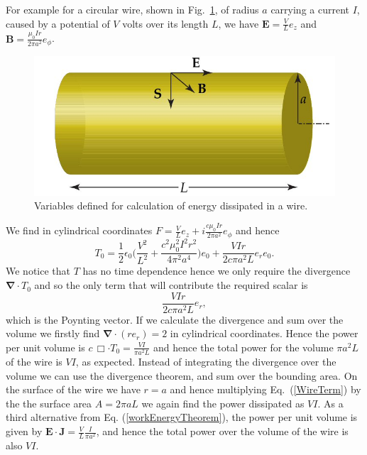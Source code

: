 \documentclass[12pt,aps,prb,preprint]{revtex4}   %
\newcommand{\be}{\begin{equation}}
\newcommand{\ee}{\end{equation}}
\newcommand{\iGA}{{i}}
\begin{document}
For example for a circular wire, shown in Fig.~\ref{powerWire}, of radius $ a $ carrying a current $ I $, caused by a potential of $ V $ volts over its length $ L $, we have $ \textbf{E} = \frac{V}{L} e_z $ and $ \textbf{B}= \frac{\mu_0 I r }{2 \pi a^2} e_{\phi} $.

\begin{figure}[htb]

\begin{center}
\includegraphics[width=4.5in]{Wire}
\end{center}

\caption{Variables defined for calculation of energy dissipated in a wire.\label{powerWire}}
\end{figure}


We find in cylindrical coordinates $ F = \frac{V}{L} e_z + \iGA \frac{c \mu_0 I r}{2 \pi a^2} e_{\phi} $ and hence 
\be
 T_0 = \frac{1}{2} \epsilon_0 \Big (\frac{V^2}{L^2} + \frac{c^2 \mu_0^2 I^2 r^2}{4 \pi^2 a^4 } \Big ) e_0 + \frac{ V I r}{2 c \pi a^2 L } e_r e_0.
\ee
We notice that $ T $ has no time dependence hence we only require the divergence $ \mathbf{\nabla} \cdot T_0 $ and so the only term that will contribute the required scalar is 
\be \label{WireTerm}
 \frac{ V I r}{2 c \pi a^2 L } e_r ,
\ee
which is the Poynting vector.
If we calculate the divergence and sum over the volume we firstly find $ \mathbf{\nabla} \cdot (r e_r) = 2 $ in cylindrical coordinates.
Hence the power per unit volume is $ c \, \Box \cdot T_0 = \frac{ V I }{ \pi a^2 L } $ and hence the total power for the volume $ \pi a^2 L $ of the wire is $ V I $, as expected.
Instead of integrating the divergence over the volume we can use the divergence theorem, and sum over the bounding area. On the surface of the wire we have $ r = a $ and hence multiplying Eq.~(\ref{WireTerm}) by the the surface area $ A = 2 \pi a L $ we again find the power dissipated as $ V I $.
As a third alternative from Eq. (\ref{workEnergyTheorem}), the power per unit volume is given by $  \mathbf{E} \cdot \mathbf{J} = \frac{V}{L} \frac{I}{\pi a^2 } $, and hence the total power over the volume of the wire is also $ V I $.
\end{document}
